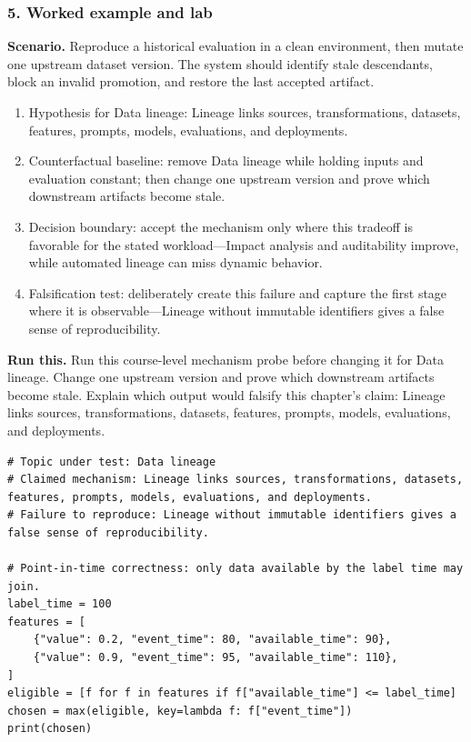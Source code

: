 \subsubsection*{5. Worked example and lab}
\textbf{Scenario.} Reproduce a historical evaluation in a clean environment, then mutate one upstream dataset version. The system should identify stale descendants, block an invalid promotion, and restore the last accepted artifact.
\begin{enumerate}
\item Hypothesis for Data lineage: Lineage links sources, transformations, datasets, features, prompts, models, evaluations, and deployments.
\item Counterfactual baseline: remove Data lineage while holding inputs and evaluation constant; then change one upstream version and prove which downstream artifacts become stale.
\item Decision boundary: accept the mechanism only where this tradeoff is favorable for the stated workload—Impact analysis and auditability improve, while automated lineage can miss dynamic behavior.
\item Falsification test: deliberately create this failure and capture the first stage where it is observable—Lineage without immutable identifiers gives a false sense of reproducibility.
\end{enumerate}
\textbf{Run this.} Run this course-level mechanism probe before changing it for Data lineage. Change one upstream version and prove which downstream artifacts become stale. Explain which output would falsify this chapter's claim: Lineage links sources, transformations, datasets, features, prompts, models, evaluations, and deployments.
\begin{Verbatim}[fontsize=\scriptsize]
# Topic under test: Data lineage
# Claimed mechanism: Lineage links sources, transformations, datasets, features, prompts, models, evaluations, and deployments.
# Failure to reproduce: Lineage without immutable identifiers gives a false sense of reproducibility.

# Point-in-time correctness: only data available by the label time may join.
label_time = 100
features = [
    {"value": 0.2, "event_time": 80, "available_time": 90},
    {"value": 0.9, "event_time": 95, "available_time": 110},
]
eligible = [f for f in features if f["available_time"] <= label_time]
chosen = max(eligible, key=lambda f: f["event_time"])
print(chosen)
\end{Verbatim}

